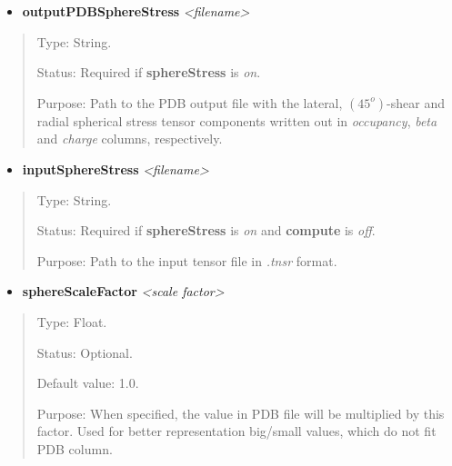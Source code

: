 \documentclass[letterpaper,10pt,english]{sphinxmanual}
\begin{document}
\begin{itemize}
\item {} 
\textbf{outputPDBSphereStress} \emph{\textless{}filename\textgreater{}}

\end{itemize}
\begin{quote}

Type: String.

Status: Required if \textbf{sphereStress} is \emph{on}.

Purpose:  Path to the PDB output file with the lateral, $(45^o)$-shear and radial spherical stress tensor components written out in \emph{occupancy}, \emph{beta} and \emph{charge} columns, respectively.
\end{quote}
\begin{itemize}
\item {} 
\textbf{inputSphereStress} \emph{\textless{}filename\textgreater{}}

\end{itemize}
\begin{quote}

Type: String.

Status: Required if \textbf{sphereStress} is \emph{on} and \textbf{compute} is \emph{off}.

Purpose:  Path to the input tensor file in \emph{.tnsr} format.
\end{quote}
\begin{itemize}
\item {} 
\textbf{sphereScaleFactor} \emph{\textless{}scale factor\textgreater{}}

\end{itemize}
\begin{quote}

Type: Float.

Status: Optional.

Default value: 1.0.

Purpose: When specified, the value in PDB file will be multiplied by this factor. Used for better representation big/small values, which do not fit PDB column.
\end{quote}
\end{document}
